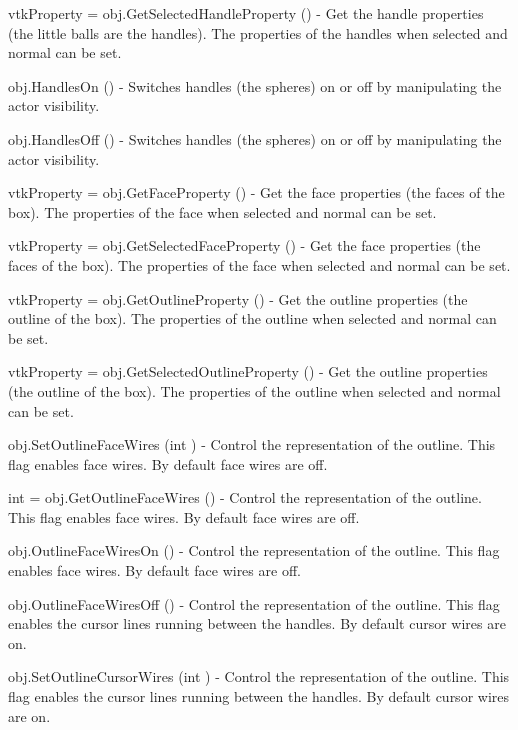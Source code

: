 \begin{DoxyItemize}
\item {\ttfamily vtk\-Property = obj.\-Get\-Selected\-Handle\-Property ()} -\/ Get the handle properties (the little balls are the handles). The properties of the handles when selected and normal can be set.  
\item {\ttfamily obj.\-Handles\-On ()} -\/ Switches handles (the spheres) on or off by manipulating the actor visibility.  
\item {\ttfamily obj.\-Handles\-Off ()} -\/ Switches handles (the spheres) on or off by manipulating the actor visibility.  
\item {\ttfamily vtk\-Property = obj.\-Get\-Face\-Property ()} -\/ Get the face properties (the faces of the box). The properties of the face when selected and normal can be set.  
\item {\ttfamily vtk\-Property = obj.\-Get\-Selected\-Face\-Property ()} -\/ Get the face properties (the faces of the box). The properties of the face when selected and normal can be set.  
\item {\ttfamily vtk\-Property = obj.\-Get\-Outline\-Property ()} -\/ Get the outline properties (the outline of the box). The properties of the outline when selected and normal can be set.  
\item {\ttfamily vtk\-Property = obj.\-Get\-Selected\-Outline\-Property ()} -\/ Get the outline properties (the outline of the box). The properties of the outline when selected and normal can be set.  
\item {\ttfamily obj.\-Set\-Outline\-Face\-Wires (int )} -\/ Control the representation of the outline. This flag enables face wires. By default face wires are off.  
\item {\ttfamily int = obj.\-Get\-Outline\-Face\-Wires ()} -\/ Control the representation of the outline. This flag enables face wires. By default face wires are off.  
\item {\ttfamily obj.\-Outline\-Face\-Wires\-On ()} -\/ Control the representation of the outline. This flag enables face wires. By default face wires are off.  
\item {\ttfamily obj.\-Outline\-Face\-Wires\-Off ()} -\/ Control the representation of the outline. This flag enables the cursor lines running between the handles. By default cursor wires are on.  
\item {\ttfamily obj.\-Set\-Outline\-Cursor\-Wires (int )} -\/ Control the representation of the outline. This flag enables the cursor lines running between the handles. By default cursor wires are on.  

\end{DoxyItemize}
